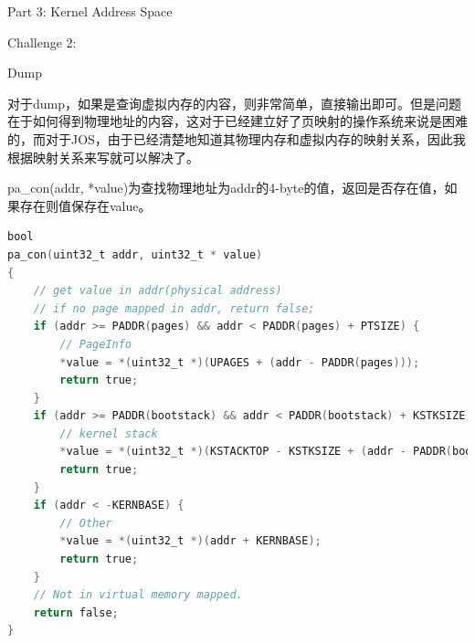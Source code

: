 \documentclass[GBK,winfonts,a4paper,10pt]{ctexart}
\begin{document}
\begin{section}{Part 3: Kernel Address Space}
\begin{subsection}{Challenge 2:}
\begin{subsubsection}{ Dump }
\par
对于dump，如果是查询虚拟内存的内容，则非常简单，直接输出即可。但是问题在于如何得到物理地址的内容，这对于已经建立好了页映射的操作系统来说是困难的，而对于JOS，由于已经清楚地知道其物理内存和虚拟内存的映射关系，因此我根据映射关系来写就可以解决了。
\par
pa\_con(addr, *value)为查找物理地址为addr的4-byte的值，返回是否存在值，如果存在则值保存在value。
\begin{lstlisting}[language=C]
bool
pa_con(uint32_t addr, uint32_t * value)
{
    // get value in addr(physical address)
    // if no page mapped in addr, return false;
    if (addr >= PADDR(pages) && addr < PADDR(pages) + PTSIZE) {
        // PageInfo
        *value = *(uint32_t *)(UPAGES + (addr - PADDR(pages)));
        return true;
    }
    if (addr >= PADDR(bootstack) && addr < PADDR(bootstack) + KSTKSIZE) {
        // kernel stack
        *value = *(uint32_t *)(KSTACKTOP - KSTKSIZE + (addr - PADDR(bootstack)));
        return true;
    }
    if (addr < -KERNBASE) {
        // Other
        *value = *(uint32_t *)(addr + KERNBASE);
        return true;
    }
    // Not in virtual memory mapped.
    return false;
}


\end{lstlisting}
\end{subsubsection}
\end{subsection}
\end{section}
\end{document}
